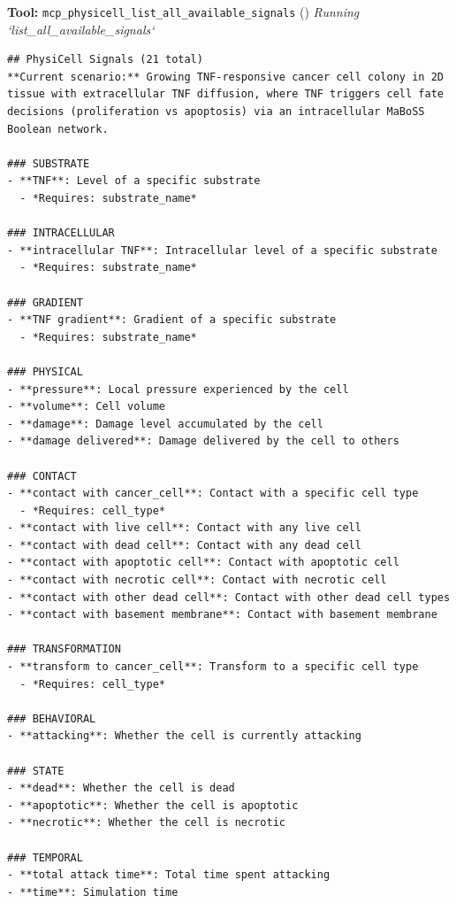 \documentclass[11pt,a4paper]{article}
\begin{document}
\begin{toolokbox}
\textbf{Tool:} \texttt{mcp\_physicell\_list\_all\_available\_signals} (\checkmark)
\textit{Running `list\_all\_available\_signals`}
\begin{lstlisting}
## PhysiCell Signals (21 total)
**Current scenario:** Growing TNF-responsive cancer cell colony in 2D tissue with extracellular TNF diffusion, where TNF triggers cell fate decisions (proliferation vs apoptosis) via an intracellular MaBoSS Boolean network.

### SUBSTRATE
- **TNF**: Level of a specific substrate
  - *Requires: substrate_name*

### INTRACELLULAR
- **intracellular TNF**: Intracellular level of a specific substrate
  - *Requires: substrate_name*

### GRADIENT
- **TNF gradient**: Gradient of a specific substrate
  - *Requires: substrate_name*

### PHYSICAL
- **pressure**: Local pressure experienced by the cell
- **volume**: Cell volume
- **damage**: Damage level accumulated by the cell
- **damage delivered**: Damage delivered by the cell to others

### CONTACT
- **contact with cancer_cell**: Contact with a specific cell type
  - *Requires: cell_type*
- **contact with live cell**: Contact with any live cell
- **contact with dead cell**: Contact with any dead cell
- **contact with apoptotic cell**: Contact with apoptotic cell
- **contact with necrotic cell**: Contact with necrotic cell
- **contact with other dead cell**: Contact with other dead cell types
- **contact with basement membrane**: Contact with basement membrane

### TRANSFORMATION
- **transform to cancer_cell**: Transform to a specific cell type
  - *Requires: cell_type*

### BEHAVIORAL
- **attacking**: Whether the cell is currently attacking

### STATE
- **dead**: Whether the cell is dead
- **apoptotic**: Whether the cell is apoptotic
- **necrotic**: Whether the cell is necrotic

### TEMPORAL
- **total attack time**: Total time spent attacking
- **time**: Simulation time


\end{lstlisting}
\end{toolokbox}
\end{document}
